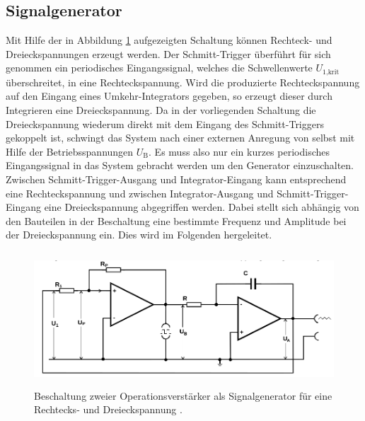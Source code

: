 \subsection{Signalgenerator}

Mit Hilfe der in Abbildung \ref{fig:signalgen} aufgezeigten Schaltung können Rechteck- und
Dreieckspannungen erzeugt werden. Der Schmitt-Trigger überführt für sich genommen ein periodisches Eingangssignal,
welches die Schwellenwerte $U_\text{1,krit}$ überschreitet, in eine Rechteckspannung.
Wird die produzierte Rechteckspannung auf den Eingang eines Umkehr-Integrators gegeben, so erzeugt dieser
durch Integrieren eine Dreieckspannung. Da in der vorliegenden Schaltung die Dreieckspannung wiederum direkt mit dem Eingang des
Schmitt-Triggers gekoppelt ist, schwingt das System nach einer externen Anregung von selbst mit Hilfe der Betriebsspannungen $U_\text{B}$.
Es muss also nur ein kurzes periodisches Eingangssignal in das System gebracht werden um den Generator einzuschalten.
Zwischen Schmitt-Trigger-Ausgang und Integrator-Eingang kann entsprechend eine Rechteckspannung und zwischen
Integrator-Ausgang und Schmitt-Trigger-Eingang eine Dreieckspannung abgegriffen werden.
Dabei stellt sich abhängig von den Bauteilen in der Beschaltung eine bestimmte Frequenz und Amplitude bei der
Dreieckspannung ein. Dies wird im Folgenden hergeleitet.

\begin{figure}
  \centering
  \includegraphics[height=5cm]{ImmerDieseNorweger/signalgenerator.png}
  \caption{Beschaltung zweier Operationsverstärker als Signalgenerator für eine Rechtecks- und Dreieckspannung \cite{anleitung}.}
  \label{fig:signalgen}
\end{figure}

